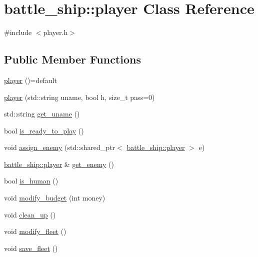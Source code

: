 \hypertarget{classbattle__ship_1_1player}{}\section{battle\+\_\+ship\+:\+:player Class Reference}
\label{classbattle__ship_1_1player}


{\ttfamily \#include $<$player.\+h$>$}

\subsection*{Public Member Functions}
\begin{DoxyCompactItemize}
\item 
\hyperlink{classbattle__ship_1_1player_a54df3c03653a24049b9629ce5c55fafa}{player} ()=default
\item 
\hyperlink{classbattle__ship_1_1player_a7aeba726c496f2304b8f6b9fb811f94d}{player} (std\+::string uname, bool h, size\+\_\+t pass=0)
\item 
std\+::string \hyperlink{classbattle__ship_1_1player_a4a5406b436812664cb706c31b745239b}{get\+\_\+uname} ()
\item 
bool \hyperlink{classbattle__ship_1_1player_af5373e08a637e9c21b3751eb02e07540}{is\+\_\+ready\+\_\+to\+\_\+play} ()
\item 
void \hyperlink{classbattle__ship_1_1player_ada39f5a20a89ffdf7218108a7dbe47c0}{assign\+\_\+enemy} (std\+::shared\+\_\+ptr$<$ \hyperlink{classbattle__ship_1_1player}{battle\+\_\+ship\+::player} $>$ e)
\item 
\hyperlink{classbattle__ship_1_1player}{battle\+\_\+ship\+::player} \& \hyperlink{classbattle__ship_1_1player_a62535f933925992eb689c2a5c2b99dd6}{get\+\_\+enemy} ()
\item 
bool \hyperlink{classbattle__ship_1_1player_a186596fe9c9f9703b2b90ec1773d5e49}{is\+\_\+human} ()
\item 
void \hyperlink{classbattle__ship_1_1player_ade02279db7265558659c40f16c482df7}{modify\+\_\+budget} (int money)
\item 
void \hyperlink{classbattle__ship_1_1player_ace54ae4286cbbaca8a8f4b6fe2a75de0}{clean\+\_\+up} ()
\item 
void \hyperlink{classbattle__ship_1_1player_ad11ef5cd2b1623b3e69c578643cffd03}{modify\+\_\+fleet} ()
\item 
void \hyperlink{classbattle__ship_1_1player_a627ee6df10bc666f9941452c2a603dec}{save\+\_\+fleet} ()
\item 

\end{DoxyCompactItemize}
